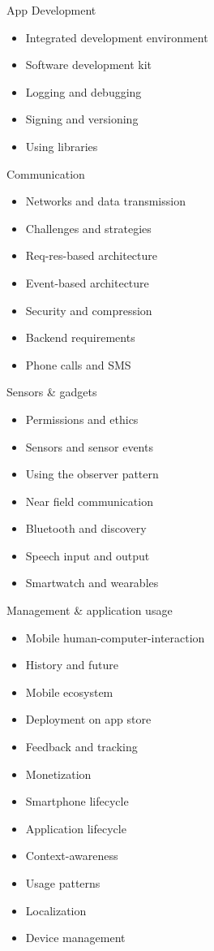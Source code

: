 App Development

\begin{itemize}
\tightlist
\item
  Integrated development environment
\item
  Software development kit
\item
  Logging and debugging
\item
  Signing and versioning
\item
  Using libraries
\end{itemize}

Communication

\begin{itemize}
\tightlist
\item
  Networks and data transmission
\item
  Challenges and strategies
\item
  Req-res-based architecture
\item
  Event-based architecture
\item
  Security and compression
\item
  Backend requirements
\item
  Phone calls and SMS
\end{itemize}

Sensors \& gadgets

\begin{itemize}
\tightlist
\item
  Permissions and ethics
\item
  Sensors and sensor events
\item
  Using the observer pattern
\item
  Near field communication
\item
  Bluetooth and discovery
\item
  Speech input and output
\item
  Smartwatch and wearables
\end{itemize}

Management \& application usage

\begin{itemize}
\tightlist
\item
  Mobile human-computer-interaction
\item
  History and future
\item
  Mobile ecosystem
\item
  Deployment on app store
\item
  Feedback and tracking
\item
  Monetization
\item
  Smartphone lifecycle
\item
  Application lifecycle
\item
  Context-awareness
\item
  Usage patterns
\item
  Localization
\item
  Device management
\end{itemize}

